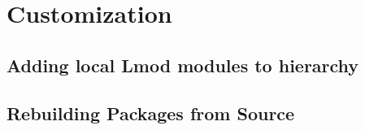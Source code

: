 \clearpage

\section{Customization} \label{appendix:customization}

\subsection{Adding local Lmod modules to \OHPC{} hierarchy} \label{appendix:modulefiles}


\newpage
\subsection{Rebuilding Packages from Source}  \label{appendix:rpmbuild}

